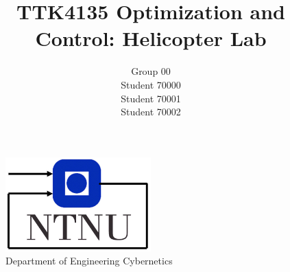 \documentclass[11pt, a4paper, USenglish]{article} %
\begin{document}
\title{TTK4135 Optimization and Control: Helicopter Lab}
\author{Group 00\\Student 70000\\Student 70001\\Student 70002}
\begin{titlepage}
    \maketitle
    \begin{figure}
    \centering
    \includegraphics[width=0.5\textwidth]{figures/itk_ntnu}\\
    Department of Engineering Cybernetics
    \end{figure}
    \thispagestyle{empty}
\end{titlepage}

\newpage

\thispagestyle{empty} %

\newpage
\tableofcontents
\thispagestyle{empty} %

\newpage
\setcounter{page}{1}


\newpage
{}
\printbibliography{}
\label{sec:bibliography}
\end{document}
